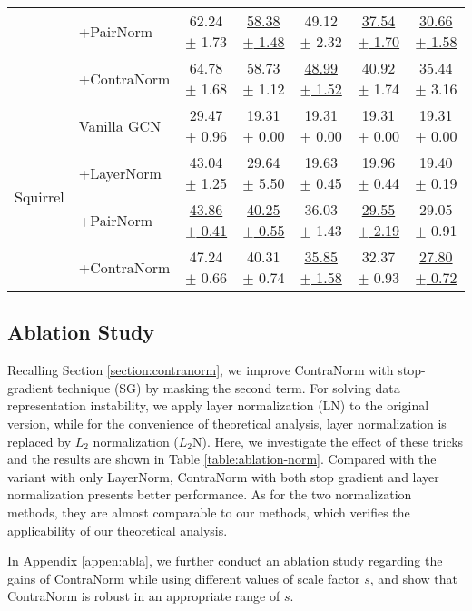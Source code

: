 \documentclass{article}
\theoremstyle{definition}
\theoremstyle{remark}
\theoremstyle{theorem}
\begin{document}
\begin{table}[!t]
{\begin{tabular}{ll cc ccc}
		~ & +PairNorm & 62.24 $\pm$ 1.73 & \underline{58.38 $\pm$ 1.48} & \cellcolor{blue!15}49.12 $\pm$ 2.32 & \underline{37.54 $\pm$ 1.70} & \underline{30.66 $\pm$ 1.58} \\
		~ & +ContraNorm  & \cellcolor{blue!15}64.78 $\pm$ 1.68 & \cellcolor{blue!15}58.73 $\pm$ 1.12 & \underline{48.99 $\pm$ 1.52} & \cellcolor{blue!15}40.92 $\pm$ 1.74 & \cellcolor{blue!15}35.44 $\pm$ 3.16 \\
		\midrule
		\multirow{4}{*}{Squirrel} & Vanilla GCN & 29.47 $\pm$ 0.96 & 19.31 $\pm$ 0.00 & 19.31 $\pm$ 0.00 & 19.31 $\pm$ 0.00 & 19.31 $\pm$ 0.00 \\
		~ & +LayerNorm  & 43.04 $\pm$ 1.25 & 29.64 $\pm$ 5.50 & 19.63 $\pm$ 0.45 & 19.96 $\pm$ 0.44 & 19.40 $\pm$ 0.19 \\
		~ & +PairNorm & \underline{43.86 $\pm$ 0.41} & \underline{40.25 $\pm$ 0.55} & \cellcolor{blue!15}36.03 $\pm$ 1.43 & \underline{29.55 $\pm$ 2.19} & \cellcolor{blue!15}29.05 $\pm$ 0.91 \\
		~ & +ContraNorm  & \cellcolor{blue!15}47.24 $\pm$ 0.66 & \cellcolor{blue!15}40.31 $\pm$ 0.74 & \underline{35.85 $\pm$ 1.58} & \cellcolor{blue!15}32.37 $\pm$ 0.93 & \underline{27.80 $\pm$ 0.72} \\
		\bottomrule    
	\end{tabular}
	}
	\label{table:gnn-acc}
 \vspace{-0.1 in}
\end{table}


\subsection{Ablation Study}

Recalling Section \ref{section:contranorm}, we improve ContraNorm with stop-gradient technique (SG) by masking the second term. For solving data representation instability, we apply layer normalization (LN) to the original version, while for the convenience of theoretical analysis, layer normalization is replaced by $L_2$ normalization ($L_2$N). Here, we investigate the effect of these tricks and the results are shown in Table \ref{table:ablation-norm}. Compared with the variant with only LayerNorm, ContraNorm with both stop gradient and layer normalization presents better performance. As for the two normalization methods, they are almost comparable to our methods, which verifies the applicability of our theoretical analysis. 

In Appendix \ref{appen:abla}, we further conduct an ablation study regarding the gains of ContraNorm while using different values of scale factor $s$, and show that ContraNorm is robust in an appropriate range of $s$.
\end{document}
